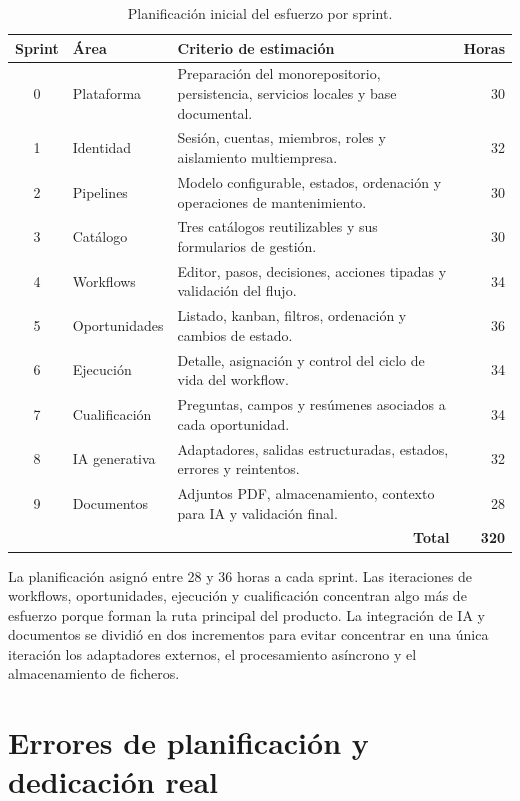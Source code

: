 \begin{table}[H]
  \centering
  \small
  \caption{Planificación inicial del esfuerzo por sprint.}
  \label{tab:initial-sprint-effort}
  \begin{tabular}{@{}clp{7.5cm}r@{}}
    \toprule
    \textbf{Sprint} & \textbf{Área} & \textbf{Criterio de estimación} & \textbf{Horas} \\
    \midrule
    0 & Plataforma & Preparación del monorepositorio, persistencia, servicios locales y base documental. & 30 \\
    1 & Identidad & Sesión, cuentas, miembros, roles y aislamiento multiempresa. & 32 \\
    2 & Pipelines & Modelo configurable, estados, ordenación y operaciones de mantenimiento. & 30 \\
    3 & Catálogo & Tres catálogos reutilizables y sus formularios de gestión. & 30 \\
    4 & Workflows & Editor, pasos, decisiones, acciones tipadas y validación del flujo. & 34 \\
    5 & Oportunidades & Listado, kanban, filtros, ordenación y cambios de estado. & 36 \\
    6 & Ejecución & Detalle, asignación y control del ciclo de vida del workflow. & 34 \\
    7 & Cualificación & Preguntas, campos y resúmenes asociados a cada oportunidad. & 34 \\
    8 & IA generativa & Adaptadores, salidas estructuradas, estados, errores y reintentos. & 32 \\
    9 & Documentos & Adjuntos PDF, almacenamiento, contexto para IA y validación final. & 28 \\
    \midrule
    \multicolumn{3}{r}{\textbf{Total}} & \textbf{320} \\
    \bottomrule
  \end{tabular}
\end{table}

La planificación asignó entre 28 y 36 horas a cada sprint. Las iteraciones de
workflows, oportunidades, ejecución y cualificación concentran algo más de
esfuerzo porque forman la ruta principal del producto. La integración de IA y
documentos se dividió en dos incrementos para evitar concentrar en una única
iteración los adaptadores externos, el procesamiento asíncrono y el
almacenamiento de ficheros.

\section{Errores de planificación y dedicación real}

